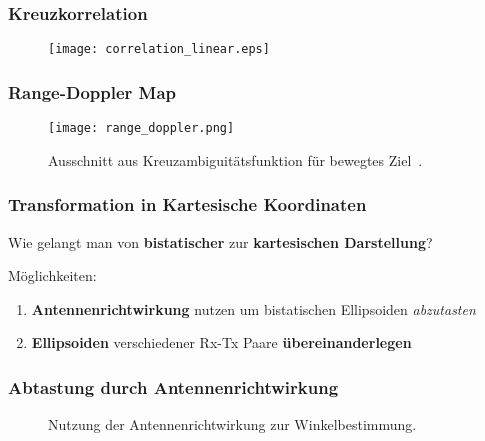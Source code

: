 \begin{frame}
    \frametitle{Kreuzkorrelation}

    \begin{figure}
        \centering
        \texttt{[image: correlation\_linear.eps]}
    \end{figure}
\end{frame}

\begin{frame}
    \frametitle{Range-Doppler Map}

    \begin{figure}
        \centering
        \texttt{[image: range\_doppler.png]}
        \caption{Ausschnitt aus Kreuzambiguitätsfunktion für bewegtes Ziel~\cite[p.~161]{Malanowski2019}.}
    \end{figure}
\end{frame}

\begin{frame}
    \frametitle{Transformation in Kartesische Koordinaten}

    \Large Wie gelangt man von \textbf{bistatischer} zur \textbf{kartesischen Darstellung}?\normalsize

    \vspace{2\baselineskip}

    Möglichkeiten:
    \begin{enumerate}
        \item \textbf{Antennenrichtwirkung} nutzen um bistatischen Ellipsoiden \emph{abzutasten}
        \item \textbf{Ellipsoiden} verschiedener Rx-Tx Paare \textbf{übereinanderlegen}
    \end{enumerate}
\end{frame}

\begin{frame}
    \frametitle{Abtastung durch Antennenrichtwirkung}

    \begin{figure}
        \centering
        \begin{adjustbox}{max width=\linewidth,totalheight=\baselineskip}
            \begin{tikzpicture}
                
            \end{tikzpicture}
        \end{adjustbox}
        \caption{Nutzung der Antennenrichtwirkung zur Winkelbestimmung.}
    \end{figure}
\end{frame}

